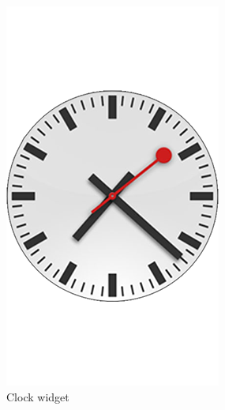 \begin{figure}[htbp]
        \centering
        \begin{subfigure}[b]{0.3\textwidth}
                \includegraphics[width=\textwidth]{images/interview/samples/clock.png}
                \caption{Clock widget}
                \label{img:cooking1}
        \end{subfigure}%
         \hfill 
        \begin{subfigure}[b]{0.3\textwidth}

\end{subfigure}
\end{figure}
